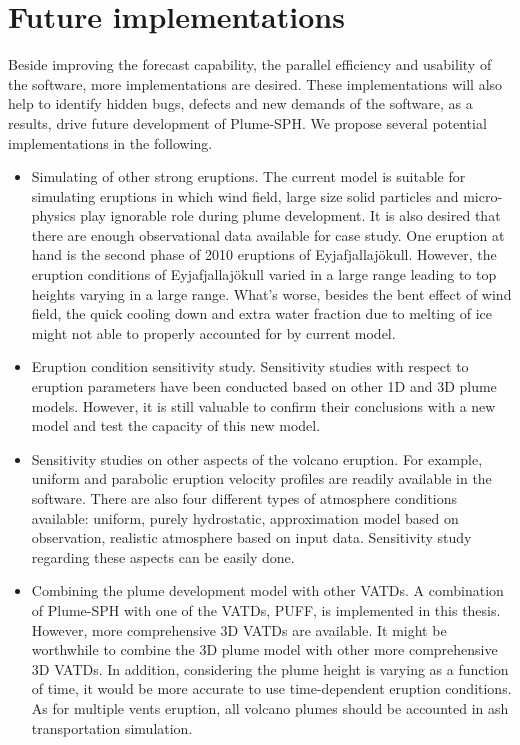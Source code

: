 \section{Future implementations}
Beside improving the forecast capability, the parallel efficiency and usability of the software, more implementations are desired. These implementations will also help to identify hidden bugs, defects and new demands of the software, as a results, drive future development of Plume-SPH.
We propose several potential implementations in the following.
\begin{itemize}
\item {Simulating of other strong eruptions. The current model is suitable for simulating eruptions in which wind field, large size solid particles and micro-physics play ignorable role during plume development. It is also desired that there are enough observational data available for case study. One eruption at hand is the second phase of 2010 eruptions of Eyjafjallajökull. However, the eruption conditions of Eyjafjallajökull varied in a large range leading to top heights varying in a large range. What's worse, besides the bent effect of wind field, the quick cooling down and extra water fraction due to melting of ice might not able to properly accounted for by current model.}
\item {Eruption condition sensitivity study. Sensitivity studies with respect to eruption parameters have been conducted based on other 1D and 3D plume models. However, it is still valuable to confirm their conclusions with a new model and test the capacity of this new model.}
\item {Sensitivity studies on other aspects of the volcano eruption. For example, uniform and parabolic eruption velocity profiles are readily available in the software. There are also four different types of atmosphere conditions available: uniform, purely hydrostatic, approximation model based on observation, realistic atmosphere based on input data. Sensitivity study regarding these aspects can be easily done.}
\item {Combining the plume development model with other VATDs. A combination of Plume-SPH with one of the VATDs, PUFF, is implemented in this thesis. However, more comprehensive 3D VATDs are available. It might be worthwhile to combine the 3D plume model with other more comprehensive 3D VATDs. In addition, considering the plume height is varying as a function of time, it would be more accurate to use time-dependent eruption conditions. As for multiple vents eruption, all volcano plumes should be accounted in ash transportation simulation.}

\end{itemize}

